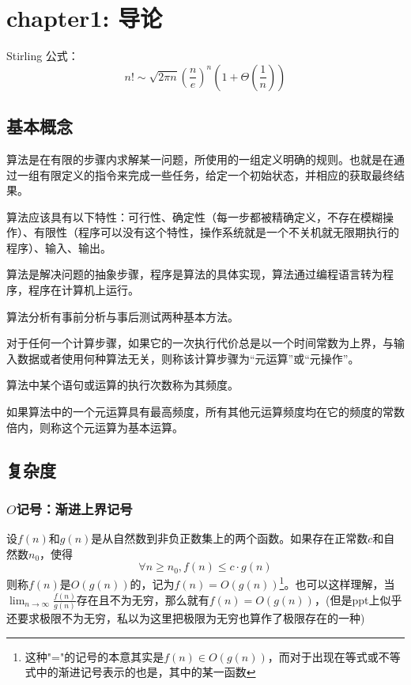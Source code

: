 \documentclass[./../main.tex]{subfiles} %
\begin{document}
\section{chapter1: 导论}

\begin{theorem}
    Stirling 公式：
    $$
    n! \sim \sqrt{2\pi n}\left(\frac{n}{e}\right)^n(1+\Theta(\frac{1}{n}))
    $$
\end{theorem}

\subsection{基本概念}
算法是在有限的步骤内求解某一问题，所使用的一组定义明确的规则。也就是在通过一组有限定义的指令来完成一些任务，给定一个初始状态，并相应的获取最终结果。

算法应该具有以下特性：可行性、确定性（每一步都被精确定义，不存在模糊操作）、有限性（程序可以没有这个特性，操作系统就是一个不关机就无限期执行的程序）、输入、输出。

算法是解决问题的抽象步骤，程序是算法的具体实现，算法通过编程语言转为程序，程序在计算机上运行。

算法分析有事前分析与事后测试两种基本方法。

\begin{definition}
    对于任何一个计算步骤，如果它的一次执行代价总是以一个时间常数为上界，与输入数据或者使用何种算法无关，则称该计算步骤为“元运算”或“元操作”。
\end{definition}
\begin{definition}
    算法中某个语句或运算的执行次数称为其频度。
\end{definition}

\begin{definition}
    如果算法中的一个元运算具有最高频度，所有其他元运算频度均在它的频度的常数倍内，则称这个元运算为基本运算。
\end{definition}

\subsection{复杂度}
\subsubsection{$O$记号：渐进上界记号}
设$f(n)$和$g(n)$是从自然数到非负正数集上的两个函数。如果存在正常数$c$和自然数$n_0$，使得
$$
\forall n\ge n_0, f(n)\le c\cdot g(n)
$$
则称$f(n)$是$O(g(n))$的，记为$f(n)=O(g(n))$\footnote{这种"="的记号的本意其实是$f(n)\in O(g(n))$，而对于出现在等式或不等式中的渐进记号表示的也是，其中的某一函数}。也可以这样理解，当$\lim_{n\to\infty}\frac{f(n)}{g(n)}$存在且不为无穷，那么就有$f(n)=O(g(n))$，(但是ppt上似乎还要求极限不为无穷，私以为这里把极限为无穷也算作了极限存在的一种)
\end{document}
